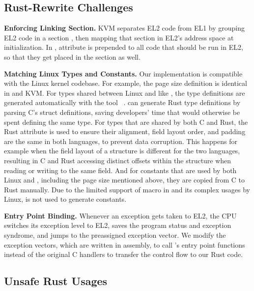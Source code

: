 \subsection{Rust-Rewrite Challenges}
\textbf{Enforcing Linking Section.}
KVM separates EL2 code from EL1 by grouping EL2 code in a section
, then mapping that section in EL2's address space at
initialization.
In \rustcore{}, attribute \code{\#[link\_section = ".hyp.text"]} is prepended
to all code that should be run in EL2, so that they get placed in the
 section as well.

\textbf{Matching Linux Types and Constants.}
Our implementation is compatible with the Linux kernel codebase. For example,
the page size definition is identical in \rustcore{} and KVM.
For types shared between Linux and \rustcore{} like , the type
definitions are generated automatically with the tool
~\cite{bindgen}.  can generate Rust type
definitions by parsing C's struct definitions, saving developers' time that
would otherwise be spent defining the same type.
For types that are shared by both C and Rust, the Rust attribute
\code{\#[repr\-(C)]} is used to ensure their alignment, field layout order, and
padding are the same in both languages, to prevent data corruption. This
happens for example when the field layout of a structure is different for the
two languages, resulting in C and Rust accessing distinct offsets within the
structure when reading or writing to the same field.
And for constants that are used by both Linux
and \rustcore{}, including the page size mentioned above, they are copied from C
to Rust manually. Due to the limited support of macro in  and its
complex usages by Linux,  is not used to generate constants.

\textbf{Entry Point Binding.}
Whenever an exception gets taken to EL2, the CPU switches its exception level
to EL2, saves the program status and exception syndrome, and jumps to the
preassigned exception vector.
We modify the exception vectors, which are written in assembly, to call
\rustcore{}'s entry point functions instead of the original C handlers to
transfer the control flow to our Rust code.

\subsection{Unsafe Rust Usages}

